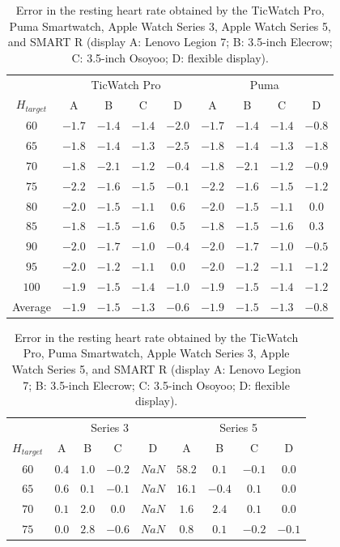 \begin{table}[!t]
  \small
  \centering
  \caption{Error in the resting heart rate obtained by the TicWatch Pro, Puma Smartwatch, Apple Watch Series 3, Apple Watch Series 5, and SMART R (display A: Lenovo Legion 7; B: 3.5-inch Elecrow; C: 3.5-inch Osoyoo; D: flexible display).}
  \begin{tabular}{c|cccc|cccc}
    \toprule
    &\multicolumn{4}{c|}{TicWatch Pro}&\multicolumn{4}{c}{Puma} \\
    $H_{target}$ & A & B & C & D & A & B & C & D \\
    \midrule
    $60$ & $-1.7$ & $-1.4$ & $-1.4$ & $-2.0$ & $-1.7$ & $-1.4$ & $-1.4$ & $-0.8$ \\
    $65$ & $-1.8$ & $-1.4$ & $-1.3$ & $-2.5$ & $-1.8$ & $-1.4$ & $-1.3$ & $-1.8$ \\
    $70$ & $-1.8$ & $-2.1$ & $-1.2$ & $-0.4$ & $-1.8$ & $-2.1$ & $-1.2$ & $-0.9$ \\
    $75$ & $-2.2$ & $-1.6$ & $-1.5$ & $-0.1$ & $-2.2$ & $-1.6$ & $-1.5$ & $-1.2$ \\
    $80$ & $-2.0$ & $-1.5$ & $-1.1$ & $0.6$ & $-2.0$ & $-1.5$ & $-1.1$ & $0.0$ \\
    $85$ & $-1.8$ & $-1.5$ & $-1.6$ & $0.5$ & $-1.8$ & $-1.5$ & $-1.6$ & $0.3$ \\
    $90$ & $-2.0$ & $-1.7$ & $-1.0$ & $-0.4$ & $-2.0$ & $-1.7$ & $-1.0$ & $-0.5$ \\
    $95$ & $-2.0$ & $-1.2$ & $-1.1$ & $0.0$ & $-2.0$ & $-1.2$ & $-1.1$ & $-1.2$ \\
    $100$ & $-1.9$ & $-1.5$ & $-1.4$ & $-1.0$ & $-1.9$ & $-1.5$ & $-1.4$ & $-1.2$ \\
    \midrule
    Average & $-1.9$ & $-1.5$ & $-1.3$ & $-0.6$ & $-1.9$ & $-1.5$ & $-1.3$ & $-0.8$ \\
    \bottomrule
  \end{tabular}
  \begin{tabular}{c|cccc|cccc}
    \toprule
    &\multicolumn{4}{c|}{Series 3}&\multicolumn{4}{c}{Series 5} \\
    $H_{target}$ & A & B & C & D & A & B & C & D \\
    \midrule
    $60$ & $0.4$ & $1.0$ & $-0.2$ & $NaN$ & $58.2$ & $0.1$ & $-0.1$ & $0.0$ \\
    $65$ & $0.6$ & $0.1$ & $-0.1$ & $NaN$ & $16.1$ & $-0.4$ & $0.1$ & $0.0$ \\
    $70$ & $0.1$ & $2.0$ & $0.0$ & $NaN$ & $1.6$ & $2.4$ & $0.1$ & $0.0$ \\
    $75$ & $0.0$ & $2.8$ & $-0.6$ & $NaN$ & $0.8$ & $0.1$ & $-0.2$ & $-0.1$ \\

\end{tabular}
\end{table}
